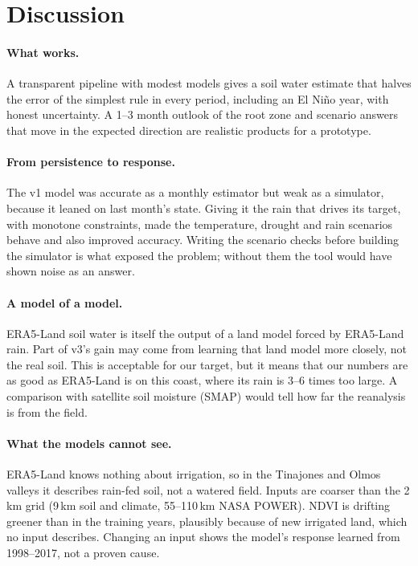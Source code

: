\documentclass[11pt,a4paper]{article}
\begin{document}
\section{Discussion}

\paragraph{What works.} A transparent pipeline with modest models gives a soil water estimate that halves the error of
the simplest rule in every period, including an El Ni\~no year, with honest uncertainty. A 1--3 month outlook of the
root zone and scenario answers that move in the expected direction are realistic products for a prototype.

\paragraph{From persistence to response.} The v1 model was accurate as a monthly estimator but weak as a simulator,
because it leaned on last month's state. Giving it the rain that drives its target, with monotone constraints, made the
temperature, drought and rain scenarios behave and also improved accuracy. Writing the scenario checks before building
the simulator is what exposed the problem; without them the tool would have shown noise as an answer.

\paragraph{A model of a model.} ERA5-Land soil water is itself the output of a land model forced by ERA5-Land rain. Part of
v3's gain may come from learning that land model more closely, not the real soil. This is acceptable for our target, but
it means that our numbers are as good as ERA5-Land is on this coast, where its rain is 3--6 times too large. A comparison
with satellite soil moisture (SMAP) would tell how far the reanalysis is from the field.

\paragraph{What the models cannot see.} ERA5-Land knows nothing about irrigation, so in the Tinajones and Olmos valleys it
describes rain-fed soil, not a watered field. Inputs are coarser than the 2\,km grid (9\,km soil and climate, 55--110\,km
NASA POWER). NDVI is drifting greener than in the training years, plausibly because of new irrigated land, which no input
describes. Changing an input shows the model's response learned from 1998--2017, not a proven cause.
\end{document}
